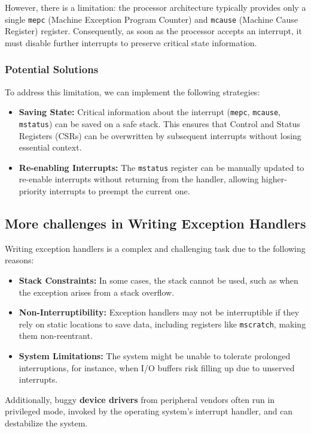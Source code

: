 However, there is a limitation: the processor architecture typically provides only a single \texttt{mepc} (Machine Exception Program Counter) and \texttt{mcause} (Machine Cause Register) register. Consequently, as soon as the processor accepts an interrupt, it must disable further interrupts to preserve critical state information.
\subsubsection*{Potential Solutions}
To address this limitation, we can implement the following strategies:
\begin{itemize}
    \item \textbf{Saving State:} Critical information about the interrupt (\texttt{mepc}, \texttt{mcause}, \texttt{mstatus}) can be saved on a safe stack. This ensures that Control and Status Registers (CSRs) can be overwritten by subsequent interrupts without losing essential context.
    \item \textbf{Re-enabling Interrupts:} The \texttt{mstatus} register can be manually updated to re-enable interrupts without returning from the handler, allowing higher-priority interrupts to preempt the current one.
\end{itemize}

\subsection{More challenges in Writing Exception Handlers}

Writing exception handlers is a complex and challenging task due to the following reasons:

\begin{itemize}
    \item \textbf{Stack Constraints:} In some cases, the stack cannot be used, such as when the exception arises from a stack overflow.
    \item \textbf{Non-Interruptibility:} Exception handlers may not be interruptible if they rely on static locations to save data, including registers like \texttt{mscratch}, making them non-reentrant.
    \item \textbf{System Limitations:} The system might be unable to tolerate prolonged interruptions, for instance, when I/O buffers risk filling up due to unserved interrupts.
\end{itemize}

Additionally, buggy \textbf{device drivers} from peripheral vendors often run in privileged mode, invoked by the operating system's interrupt handler, and can destabilize the system. 

